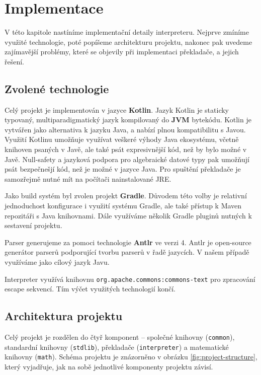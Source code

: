 \chapter{Implementace}

V této kapitole nastíníme implementační detaily interpreteru. Nejprve zmíníme
využité technologie, poté popíšeme architekturu projektu, nakonec pak uvedeme
zajímavější problémy, které se objevily při implementaci překladače, a jejich
řešení.

\section{Zvolené technologie}

Celý projekt je implementován v jazyce \textbf{Kotlin}. Jazyk Kotlin je staticky
typovaný, multiparadigmatický jazyk kompilovaný do \textbf{JVM} bytekódu.
Kotlin je vytvářen jako alternativa k jazyku Java, a nabízí plnou kompatibilitu
s Javou. Využití Kotlinu umožňuje využívat veškeré výhody Java ekosystému,
včetně knihoven psaných v Javě, ale také psát expresivnější kód, než by bylo
možné v Javě. Null-safety a jazyková podpora pro algebraické datové typy pak
umožňují psát bezpečnešjí kód, než je možné v jazyce Java. Pro spuštění
překladače je samozřejmě nutné mít na počítači nainstalované JRE.

Jako build systém byl zvolen projekt \textbf{Gradle}. Důvodem této volby je
relativní jednoduchost konfigurace i využití systému Gradle, ale také přístup
k Maven repozitáři s Java knihovnami. Dále využíváme několik Gradle pluginů
nutných k sestavení projektu.

Parser generujeme za pomoci technologie \textbf{Antlr} ve verzi 4. Antlr je
open-source generátor parserů podporující tvorbu parserů v řadě jazycích.
V našem případě využíváme jako cílový jazyk Javu.

Interpreter využívá knihovnu \lstinline{org.apache.commons:commons-text}
pro zpracování escape sekvencí. Tím výčet využitých technologií končí.

\section{Architektura projektu}

Celý projekt je rozdělen do čtyř komponent -- společné knihovny
(\lstinline{common}), standardní knihovny (\lstinline{stdlib}), překladače
(\lstinline{interpreter}) a matematické knihovny (\lstinline{math}). Schéma
projektu je znázorněno v obrázku \ref{fig:project-structure}, který vyjadřuje,
jak na sobě jednotlivé komponenty projektu závisí.

